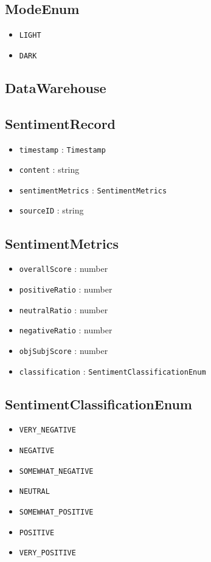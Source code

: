 \documentclass[12pt]{article}
\begin{document}
\subsection{ModeEnum}
\begin{itemize}
  \item \texttt{LIGHT}
  \item \texttt{DARK}
\end{itemize}

\subsection{DataWarehouse}

\subsection{SentimentRecord}
\begin{itemize}
  \item \texttt{timestamp} : \texttt{Timestamp}
  \item \texttt{content} : string
  \item \texttt{sentimentMetrics} : \texttt{SentimentMetrics}
  \item \texttt{sourceID} : string
\end{itemize}

\subsection{SentimentMetrics}
\begin{itemize}
  \item \texttt{overallScore} : number
  \item \texttt{positiveRatio} : number
  \item \texttt{neutralRatio} : number
  \item \texttt{negativeRatio} : number
  \item \texttt{objSubjScore} : number
  \item \texttt{classification} : \texttt{SentimentClassificationEnum}
\end{itemize}

\subsection{SentimentClassificationEnum}
\begin{itemize}
  \item \texttt{VERY\_NEGATIVE}
  \item \texttt{NEGATIVE}
  \item \texttt{SOMEWHAT\_NEGATIVE}
  \item \texttt{NEUTRAL}
  \item \texttt{SOMEWHAT\_POSITIVE}
  \item \texttt{POSITIVE}
  \item \texttt{VERY\_POSITIVE}
\end{itemize}
\end{document}
